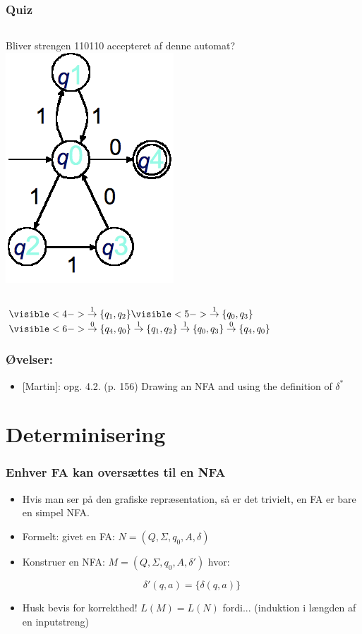 \begin{frame}
\frametitle{Quiz}
\begin{columns}
\column{5cm} Bliver strengen 110110 accepteret af denne automat?
\column{5cm}
\includegraphics[scale=0.4]{images/2_seminar_quiz_NFA}
\end{columns}
$
\visible<4->{\sarrow{1} \{q_1, q_2\}}
\visible<5->{\sarrow{1} \{q_0, q_3\}} $
$\visible<6->{\sarrow{0} \{q_4, q_0\} \sarrow{1} \{q_1, q_2\} \sarrow{1} \{q_0, q_3\} \sarrow{0} 
\{q_4, q_0\}}$
\end{frame}
\begin{frame}
\frametitle{Øvelser:}
\begin{itemize}
\item{} [Martin]: opg. 4.2. (p. 156)
Drawing an NFA and using the definition of $\delta^*$
\end{itemize}
\end{frame}

\section{Determinisering}
\begin{frame}
\frametitle{Enhver FA kan oversættes til en NFA}
\begin{itemize}[<+->]
\item Hvis man ser på den grafiske repræsentation, så er det trivielt,
  en FA er bare en simpel NFA.
\item Formelt: givet en FA: $N=(Q, \Sigma, q_0, A, \delta)$
\item Konstruer en NFA: $M=(Q, \Sigma, q_0, A, \delta')$ hvor:
  
\[\delta'(q,a) = \{\delta(q,a)\}\]
\item Husk bevis for korrekthed! $L(M)=L(N)$ fordi... (induktion i længden af en inputstreng)
\end{itemize}
\end{frame}

